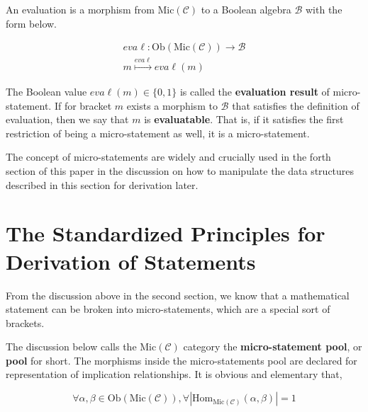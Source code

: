 \documentclass[preprint]{elsarticle}
\numberwithin{theorem}{section}	%
\numberwithin{axiom}{section}	%
\numberwithin{definition}{section}	%
\begin{document}
\begin{definition}
	An evaluation is a morphism from \(\text{Mic}(\mathcal{C})\) to a Boolean algebra \(\mathcal{B}\) with the form below.
	
	\begin{equation}
		\begin{gathered}
			\mathit{e}\mathit{v}\mathit{a}\ell :\text{Ob}(\text{Mic}(\mathcal{C}))\to \mathcal{B}\\
			\mathit{m}\overset{\mathit{e}\mathit{v}\mathit{a}\ell }{\mapsto }\mathit{e}\mathit{v}\mathit{a}\ell (\mathit{m})
		\end{gathered}
	\end{equation}
	
	The Boolean value \(\mathit{e}\mathit{v}\mathit{a}\ell (\mathit{m})\in \{0,1\}\) is called the \textbf{ evaluation result} of micro-statement. If for bracket \(\mathit{m}\) exists a morphism to \(\mathcal{B}\) that satisfies the definition of evaluation, then we say that \(\mathit{m}\) is \textbf{ evaluatable}. That is, if it satisfies the first restriction of being a micro-statement as well, it is a micro-statement.
\end{definition}

The concept of micro-statements are widely and crucially used in the forth section of this paper in the discussion on how to manipulate the data structures described in this section for derivation later.

\section{The Standardized Principles for Derivation of Statements}

From the discussion above in the second section, we know that a mathematical statement can be broken into micro-statements, which are a special sort of brackets.

The discussion below calls the \(\text{Mic}(\mathcal{C})\) category the \textbf{ micro-statement pool}, or \textbf{ pool} for short. The morphisms inside the micro-statements pool are declared for representation of implication relationships. It is obvious and elementary that,

\begin{equation}
	\forall \alpha ,\beta \in \text{Ob}(\text{Mic}(\mathcal{C})), \forall \left|\text{Hom}_{\text{Mic}(\mathcal{C})}(\alpha ,\beta )\right|=1
\end{equation}
\end{document}
